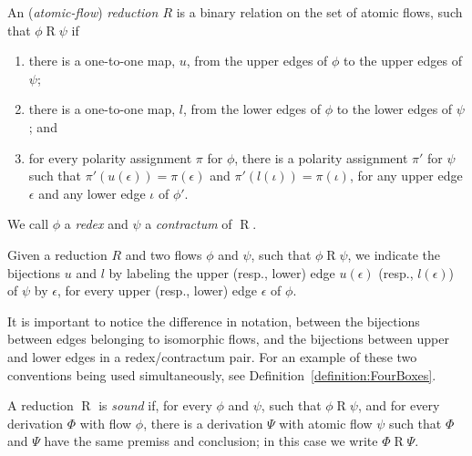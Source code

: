 \begin{definition}\label{definition:FlowReduction}
An (\emph{atomic-flow}) \emph{reduction $R$} is a binary relation on the set of atomic flows, such that $\phi\mathrel{R}\psi$ if
\begin{enumerate}
\item
there is a one-to-one map, $u$, from the upper edges of $\phi$ to the upper edges of $\psi$;
\item
there is a one-to-one map, $l$, from the lower edges of $\phi$ to the lower edges of $\psi$; and
\item\label{definition:FlowReduction:item:Polarity}
for every polarity assignment $\pi$ for $\phi$, there is a polarity assignment $\pi'$ for $\psi$ such that $\pi'(u(\epsilon))=\pi(\epsilon)$ and $\pi'(l(\iota))=\pi(\iota)$, for any upper edge $\epsilon$ and any lower edge $\iota$ of $\phi'$.
\end{enumerate}
We call $\phi$ a \emph{redex} and $\psi$ a \emph{contractum} of $\mathrel R$.
\end{definition}

\begin{convention}\label{convention:LabelBijectionEdgesReduction}
Given a reduction $R$ and two flows $\phi$ and $\psi$, such that $\phi\mathrel{R}\psi$, we indicate the bijections $u$ and $l$ by labeling the upper (resp., lower) edge $u(\epsilon)$ (resp., $l(\epsilon)$) of $\psi$ by $\epsilon$, for every upper (resp., lower) edge $\epsilon$ of $\phi$.
\end{convention}

It is important to notice the difference in notation, between the bijections between edges belonging to isomorphic flows, and the bijections between upper and lower edges in a redex/contractum pair. For an example of these two conventions being used simultaneously, see Definition~\vref{definition:FourBoxes}.

\begin{definition}\label{definition:SoundRedcution}
A reduction $\mathrel{R}$ is \emph{sound} if, for every $\phi$ and $\psi$, such that $\phi\mathrel{R}\psi$, and for every derivation $\Phi$ with flow $\phi$, there is a derivation $\Psi$ with atomic flow $\psi$ such that $\Phi$ and $\Psi$ have the same premiss and conclusion; in this case we write $\Phi\mathrel{R}\Psi$.
\end{definition}


